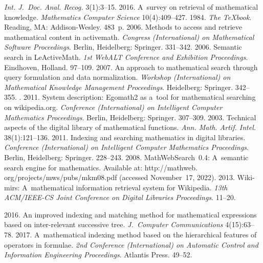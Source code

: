 \begin{multicols}{2}
{{\begin{thebibliography}{99}
\textit{Int. J.~Doc. Anal. Recog.} 3(1):3--15.
 2016. A~survey on retrieval of mathematical knowledge. 
\textit{Mathematics Computer Science} 10(4):409--427.
 1984. \textit{The \TeX book}. Reading, MA: Addison-Wesley. 483~p.
 2006. Methods to access and retrieve mathematical content in 
activemath. \textit{Congress (International) on Mathematical Software Proceedings}.  Berlin, Heidelberg: 
Springer. 331--342.
 2006. Semantic search in \mbox{LeActiveMath}. \textit{1st WebALT 
Conference and Exhibition Proceedings}.  Eindhoven, Holland. 97--109.
 2007. An approach to mathematical search through query 
formulation and data normalization.  \textit{Workshop (International) on Mathematical Knowledge 
Management Proceedings}. Heidelberg: Springer. 342--355.
. 2011. System 
description: Egomath2 as a~tool for mathematical searching on wikipedia.org. \textit{Conference 
(International) on Intelligent Computer Mathematics Proceedings}. Berlin, Heidelberg: Springer. 307--309.
 2003. Technical aspects of the digital library of mathematical 
functions. \textit{Ann. Math. Artif. Intel.} 38(1):121--136.
 2011. Indexing and searching 
mathematics in digital libraries. \textit{Conference (International) on Intelligent Computer Mathematics 
Proceedings}. Berlin, Heidelberg: Springer. 228--243. 
 2008. 
MathWebSearch~0.4: A~semantic search engine for mathematics. Available at: {\sf  
http://mathweb. org/projects/mws/pubs/mkm08.pdf} (accessed November~17, 2022).
 2013. Wiki-mirs: 
A~mathematical information retrieval system for Wikipedia. \textit{13th ACM/IEEE-CS Joint 
Conference on Digital Libraries Proceedings}. 11--20.

 2016. An improved indexing and matching 
method for mathematical expressions based on inter-relevant successive tree. \textit{J.~Computer  
Communications} 4(15):63--78.
 2017. A~mathematical indexing method based on the hierarchical features of operators in 
formulae. \textit{2nd  Conference (International) on Automatic Control and Information Engineering 
Proceedings}. Atlantis Press. 49--52.


\end{thebibliography}}}
\end{multicols}
